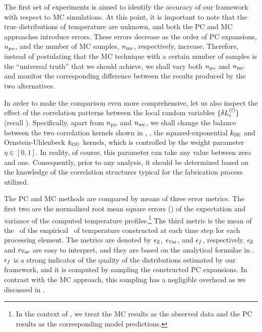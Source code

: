 The first set of experiments is aimed to identify the accuracy of our framework with respect to MC simulations.
At this point, it is important to note that the true distributions of temperature are unknown, and both the PC and MC approaches introduce errors.
These errors decrease as the order of PC expansions, ${n_\text{po}}$, and the number of MC samples, ${n_\text{mc}}$, respectively, increase.
Therefore, instead of postulating that the MC technique with a certain number of samples is the ``universal truth'' that we should achieve, we shall vary both ${n_\text{po}}$ and ${n_\text{mc}}$ and monitor the corresponding difference between the results produced by the two alternatives.

In order to make the comparison even more comprehensive, let us also inspect the effect of the correlation patterns between the local random variables $\{ \delta L^{(l)}_i \}$ (recall ).
Specifically, apart from ${n_\text{po}}$ and ${n_\text{mc}}$, we shall change the balance between the two correlation kernels shown in , \ie, the squared-exponential $k_{\text{SE}}$ and Ornstein-Uhlenbeck $k_{\text{OU}}$ kernels, which is controlled by the weight parameter $\eta \in [0, 1]$.
In reality, of course, this parameter can take any value between zero and one.
Consequently, prior to any analysis, it should be determined based on the knowledge of the correlation structures typical for the fabrication process utilized.

The PC and MC methods are compared by means of three error metrics.
The first two are the normalized root mean square errors (\nrmses) of the expectation and variance of the computed temperature profiles.\footnote{In the context of \nrmses, we treat the MC results as the observed data and the PC results as the corresponding model predictions.}
The third metric is the mean of the \nrmses\ of the empirical \pdfs\ of temperature constructed at each time step for each processing element.
The metrics are denoted by $\epsilon_\mathbb{E}$, $\epsilon_{\mathbb{V}\text{ar}}$, and $\epsilon_f$, respectively.
$\epsilon_\mathbb{E}$ and $\epsilon_{\mathbb{V}\text{ar}}$ are easy to interpret, and they are based on the analytical formulae in .
$\epsilon_f$ is a strong indicator of the quality of the distributions estimated by our framework, and it is computed by sampling the constructed PC expansions.
In contrast with the MC approach, this sampling has a negligible overhead as we discussed in .

